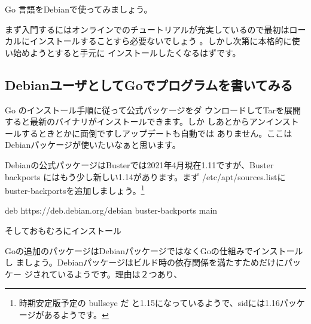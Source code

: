 \documentclass[mingoth,a4paper]{jsarticle}
\begin{document}
\begin{multicols}{2}
 
\end{multicols}




Go 言語をDebianで使ってみましょう。

まず入門するにはオンラインでのチュートリアルが充実しているので最初はロー
カルにインストールすることすら必要ないでしょう\cite{golang:tourofgo}
\cite{golang:tourofgoja}。しかし次第に本格的に使い始めようとすると手元に
インストールしたくなるはずです。

\subsection{DebianユーザとしてGoでプログラムを書いてみる}

Go のインストール手順\cite{golangorg-install}に従って公式パッケージをダ
ウンロードしてTarを展開すると最新のバイナリがインストールできます。しか
しあとからアンインストールするときとかに面倒ですしアップデートも自動では
ありません。ここはDebianパッケージが使いたいなぁと思います。

Debianの公式パッケージはBusterでは2021年4月現在1.11ですが、Buster
backports にはもう少し新しい1.14があります。まず /etc/apt/sources.listに
buster-backportsを追加しましょう。\footnote{時期安定版予定の bullseye だ
と1.15になっているようで、sidには1.16パッケージがあるようです。}

\begin{commandline}
deb https://deb.debian.org/debian buster-backports main
\end{commandline}

そしておもむろにインストール


Goの追加のパッケージはDebianパッケージではなくGoの仕組みでインストールし
ましょう。Debianパッケージはビルド時の依存関係を満たすためだけにパッケー
ジされているようです。理由は２つあり、
\end{document}
